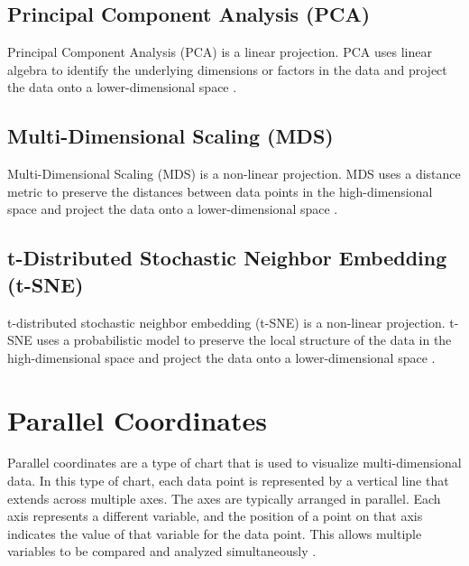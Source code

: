 \subsection{Principal Component Analysis (PCA)}

Principal Component Analysis (PCA) is a linear projection. PCA uses
linear algebra to identify the underlying dimensions or factors in the
data and project the data onto a lower-dimensional space
\parencite{abdi2010principal}.


\subsection{Multi-Dimensional Scaling (MDS)}

Multi-Dimensional Scaling (MDS) is a non-linear projection. MDS uses a
distance metric to preserve the distances between data points in the
high-dimensional space and project the data onto a lower-dimensional
space \parencite{morrison2003fast}.


\subsection{t-Distributed Stochastic Neighbor Embedding (t-SNE)}

t-distributed stochastic neighbor embedding (t-SNE) is a non-linear
projection. t-SNE uses a probabilistic model to preserve the local
structure of the data in the high-dimensional space and project the
data onto a lower-dimensional space \parencite{van2008visualizing}.







\section{Parallel Coordinates}

Parallel coordinates are a type of chart that is used to visualize
multi-dimensional data. In this type of chart, each data point is
represented by a vertical line that extends across multiple axes. The
axes are typically arranged in parallel. Each axis represents a
different variable, and the position of a point on that axis indicates
the value of that variable for the data point. This allows multiple
variables to be compared and analyzed simultaneously
\parencite{inselberg1990parallel}.







